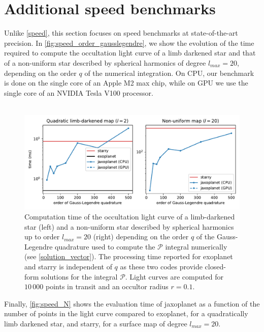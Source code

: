 \documentclass[modern]{aastex631}
\begin{document}
\section{Additional speed benchmarks}\label{precise_speed}
Unlike \autoref{speed}, this section focuses on speed benchmarks at state-of-the-art precision. In \autoref{fig:speed_order_gausslegendre}, we show the evolution of the time required to compute the occultation light curve of a limb darkened star and that of a non-uniform star described by spherical harmonics of degree $l_{max}=20$, depending on the order $q$ of the numerical integration. On CPU, our benchmark is done on the single core of an Apple M2 max chip, while on GPU we use the single core of an NVIDIA Tesla V100 processor.\\\\
\begin{figure}[H]
    \begin{center} 
        \includegraphics[width=\textwidth]{../workflows/figures/speed_vs_order.pdf}
        \caption{Computation time of the occultation light curve of a limb-darkened star (left) and a non-uniform star described by spherical harmonics up to order $l_{max}=20$ (right) depending on the order $q$ of the Gauss-Legendre quadrature used to compute the $\mathcal{P}$ integral numerically (see \autoref{solution_vector}). The processing time reported for \textsf{exoplanet} and \textsf{starry} is independent of $q$ as these two codes provide closed-form solutions for the integral $\mathcal{P}$. Light curves are computed for $10\,000$ points in transit and an occultor radius $r=0.1$. }
        \label{fig:speed_order_gausslegendre}
    \end{center}
\end{figure}
Finally, \autoref{fig:speed_N} shows the evaluation time of \textsf{jaxoplanet} as a function of the number of points in the light curve compared to \textsf{exoplanet}, for a quadratically limb darkened star, and \textsf{starry}, for a surface map of degree $l_{max} = 20$. 
\end{document}
